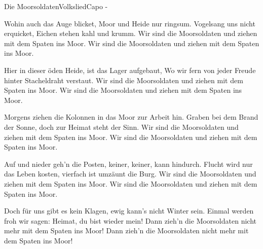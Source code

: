 \begin{song}{Die Moorsoldaten}{Volkslied}{Capo -}

Wohin auch das Auge blicket, Moor und Heide nur ringsum.
Vogelsang uns nicht erquicket, Eichen stehen kahl und krumm.
Wir sind die Moorsoldaten und ziehen mit dem Spaten ins Moor.
Wir sind die Moorsoldaten und ziehen mit dem Spaten ins Moor.

Hier in dieser öden Heide, ist das Lager aufgebaut,
Wo wir fern von jeder Freude hinter Stacheldraht verstaut.
Wir sind die Moorsoldaten und ziehen mit dem Spaten ins Moor.
Wir sind die Moorsoldaten und ziehen mit dem Spaten ins Moor.

Morgens ziehen die Kolonnen in das Moor zur Arbeit hin.
Graben bei dem Brand der Sonne, doch zur Heimat steht der Sinn.
Wir sind die Moorsoldaten und ziehen mit dem Spaten ins Moor.
Wir sind die Moorsoldaten und ziehen mit dem Spaten ins Moor.

Auf und nieder geh'n die Posten, keiner, keiner, kann hindurch.
Flucht wird nur das Leben kosten, vierfach ist umzäunt die Burg.
Wir sind die Moorsoldaten und ziehen mit dem Spaten ins Moor.
Wir sind die Moorsoldaten und ziehen mit dem Spaten ins Moor.

Doch für uns gibt es kein Klagen, ewig kann's nicht Winter sein.
Einmal werden froh wir sagen: Heimat, du bist wieder mein!
Dann zieh'n die Moorsoldaten nicht mehr mit dem Spaten ins Moor!
Dann zieh'n die Moorsoldaten nicht mehr mit dem Spaten ins Moor!
\end{song}